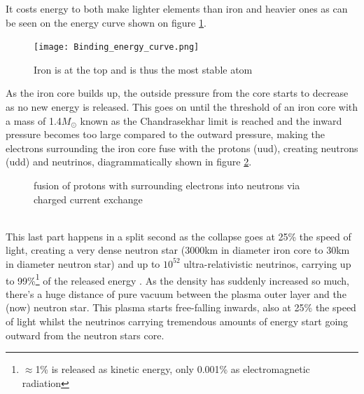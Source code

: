 It costs energy to both make lighter elements than iron and heavier ones as can
be seen on the energy curve shown on figure \ref{fig:BindingEnergyCurve}.
\begin{figure}[!ht]
	\centering
	\texttt{[image: Binding\_energy\_curve.png]}
	\caption{Iron is at the top and is thus the most stable atom}
	\label{fig:BindingEnergyCurve}
\end{figure}
As the iron core builds up, the outside
pressure from the core starts to decrease as no new energy is released. This
goes on until  the threshold of an iron core with a mass of 1.4$M_\odot$ known
as the Chandrasekhar limit\cite{Chandrasekhar}\cite{weinberg1972gravitation} 
is reached and the inward pressure becomes too
large compared to the outward pressure, making the electrons surrounding the
iron core fuse with the protons (uud), creating neutrons (udd) and neutrinos,
diagrammatically shown in figure
\ref{fig:CoreFusion}.
\begin{figure}[h]
	\centering
	\caption{fusion of protons with surrounding electrons into neutrons via charged current exchange}
	\label{fig:CoreFusion}
\end{figure}\\
This last part happens in a split second as the collapse goes at 25\% the speed
of light, creating a very dense neutron star (3000km in diameter iron core to
30km in diameter neutron star) and up to $10^{52}$ ultra-relativistic
neutrinos, carrying up to 99\%\footnote{$\approx$1\% is released as kinetic energy, only 0.001\% as
electromagnetic radiation} of the released energy
\cite{Melson_2015}. As the density has suddenly increased so much,
there's a huge distance of pure vacuum between the plasma outer layer and the
(now) neutron star. This plasma starts free-falling inwards, also at 25\% the
speed of light whilst the neutrinos carrying tremendous amounts of energy start
going outward from the neutron stars core.

